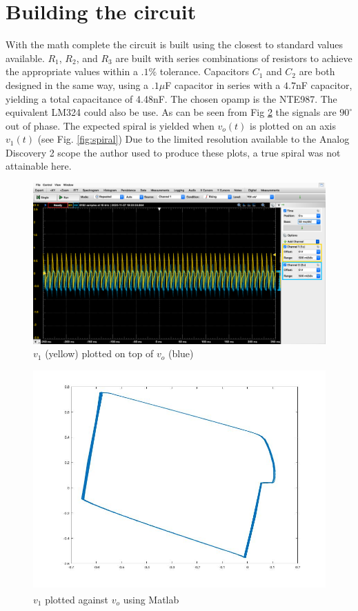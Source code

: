 \documentclass[conference]{IEEEtran}
\begin{document}
\section{Building the circuit}
With the math complete the circuit is built using the closest to standard values available. $R_1$, $R_2$, and $R_3$ are built with series combinations of resistors to achieve the appropriate values within a $.1\%$ tolerance. Capacitors $C_1$ and $C_2$ are both designed in the same way, using a $.1\mu$F capacitor in series with a $4.7$nF capacitor, yielding a total capacitance of 4.48nF. The chosen opamp is the NTE987. The equivalent LM324 could also be use. As can be seen from Fig \ref{fig:scope} the signals are $90^{\circ} $ out of phase. The expected spiral is yielded when $v_o(t)$ is plotted on an axis $v_1(t)$ (see Fig. \ref{fig:spiral})  Due to the limited resolution available to the Analog Discovery 2 scope the author used to produce these plots, a true spiral was not attainable here.
\begin{figure}[h]
    \centering
    \includegraphics[scale=.15]{scope.png}
    \caption{$v_1$ (yellow) plotted on top of $v_o$ (blue)}
    \label{fig:scope}
\end{figure}
\begin{figure}[h]
    \centering
    \includegraphics[scale=.3]{graph.jpg}
    \caption{$v_1$ plotted against $v_o$ using Matlab\textsuperscript{\tiny\textregistered}}
    \label{fig:scope}
\end{figure}
\end{document}
